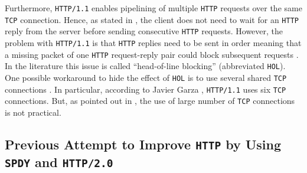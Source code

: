 \documentclass[12pt,a4paper,twoside,openright]{report}
\begin{document}
Furthermore, \texttt{HTTP/1.1} enables pipelining of multiple \texttt{HTTP} requests over the same \texttt{TCP} connection.
Hence, as stated in \cite{bib_digital_ocean_http11_vs_http2}, the client does not need to wait for an \texttt{HTTP} reply from the server before sending consecutive \texttt{HTTP} requests.
However, the problem with \texttt{HTTP/1.1} is that \texttt{HTTP} replies need to be sent in order \cite{RFC7540} meaning that a missing packet of one \texttt{HTTP} request-reply pair could block subsequent requests \cite{bib_digital_ocean_http11_vs_http2}.
In the literature this issue is called \enquote{head-of-line blocking} (abbreviated \texttt{HOL}).
One possible workaround to hide the effect of \texttt{HOL} is to use several shared \texttt{TCP} connections \cite{bib_digital_ocean_http11_vs_http2}.
In particular, according to Javier Garza \cite{bib_will-http2-make-my-site-faster}, \texttt{HTTP/1.1} uses six \texttt{TCP} connections.
But, as pointed out in \cite{bib_digital_ocean_http11_vs_http2}, the use of large number of \texttt{TCP} connections is not practical.



\subsection{Previous Attempt to Improve \texttt{HTTP} by Using \texttt{SPDY} and \texttt{HTTP/2.0}} \label{Previous_attempt_to_improve_http_by_using_SPDY_and_HTTP2}
\end{document}
